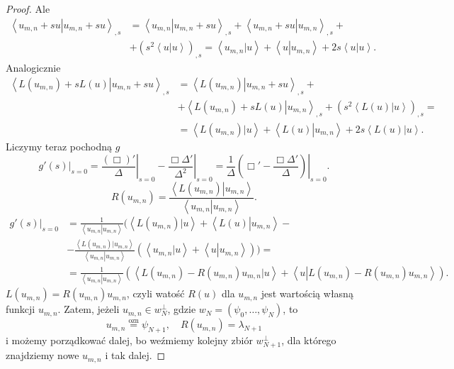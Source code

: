 \documentclass[../main.tex]{subfiles}
\begin{document}
\begin{proof}
Ale
\begin{align*}
		\left<u_{m,n}+su \left| u_{m,n}+su\right. \right> _{,s}&= \left<u_{m,n} \left| u_{m,n}+su\right. \right> _{,s} + \left<u_{m,n}+su \left| u_{m,n}\right. \right> _{,s} +\\
		&+\left( s^2 \left<u \left| u\right. \right>  \right) _{,s} = \left<u_{m,n} \left| u\right. \right> + \left<u \left| u_{m,n}\right. \right> + 2s \left<u \left| u\right. \right>
.\end{align*}
Analogicznie
\begin{align*}
		\left<L\left( u_{m,n} \right) +sL(u) \left| u_{m,n}+su\right. \right> _{,s} &= \left<L\left( u_{m,n} \right)  \left| u_{m,n}+su\right. \right> _{,s} + \\
				 &+ \left<L\left( u_{m,n} \right) + sL(u) \left| u_{m,n}\right. \right> _{,s} + \left( s^2 \left<L(u) \left| u\right. \right> \right) _{,s} =\\
				 &= \left<L\left( u_{m,n} \right)  \left| u\right. \right> + \left<L(u) \left| u_{m,n}\right. \right> + 2s \left<L(u) \left| u\right. \right>
.\end{align*}
Liczymy teraz pochodną $g $
\[
		\left. g'(s)\right|_{s=0} = \left.\frac{(\Box)'}{\Delta}\right|_{s=0} - \left.\frac{\Box \Delta'}{\Delta^2}\right|_{s=0} = \frac{1}{\Delta}\left.\left( \Box' - \frac{\Box \Delta'}{\Delta} \right) \right|_{s=0}
.\]
\[
		R(u_{m,n}) = \frac{\left<L(u_{m,n}) \left| u_{m,n}\right. \right>}{\left<u_{m,n} \left| u_{m,n}\right. \right> }
.\]
\begin{align*}
		\left.g'(s)\right|_{s=0} &= \frac{1}{\left<u_{m,n} \left| u_{m,n}\right. \right> } \Big( \left<L(u_{m,n}) \left| u\right. \right> + \left<L(u) \left| u_{m,n}\right. \right> - \\
		&- \frac{\left<L(u_{m,n})|u_{m,n}\right>}{\left<u_{m,n} \left| u_{m,n}\right. \right> }\left( \left<u_{m,n} \left| u\right. \right> + \left<u \left| u_{m,n}\right. \right>  \right)  \Big)=\\
		&=\frac{1}{\left<u_{m,n} \left| u_{m,n}\right. \right> }\left( \left<L(u_{m,n}) - R(u_{m,n})u_{m,n} \left| u\right. \right> + \left<u \left| L(u_{m,n})-R(u_{m,n})u_{m,n}\right. \right>  \right)
.\end{align*}
				 $L(u_{m,n}) = R(u_{m,n})u_{m,n}$, czyli watość $R(u)$ dla $u_{m,n}$ jest wartością własną funkcji $u_{m,n}$. Zatem, jeżeli $u_{m,n}\in w_N^\perp$, gdzie $w_N = \left( \psi_0,\ldots,\psi_N \right) $, to
				 \[
						 u_{m,n} \overset{\text{ozn}}{=} \psi_{N+1},\quad R(u_{m,n}) = \lambda_{N+1}
				 \]
				 i możemy porządkować dalej, bo weźmiemy kolejny zbiór $w_{N+1}^\perp$, dla którego znajdziemy nowe $u_{m,n}$ i tak dalej.
		 \end{proof}
\end{document}
